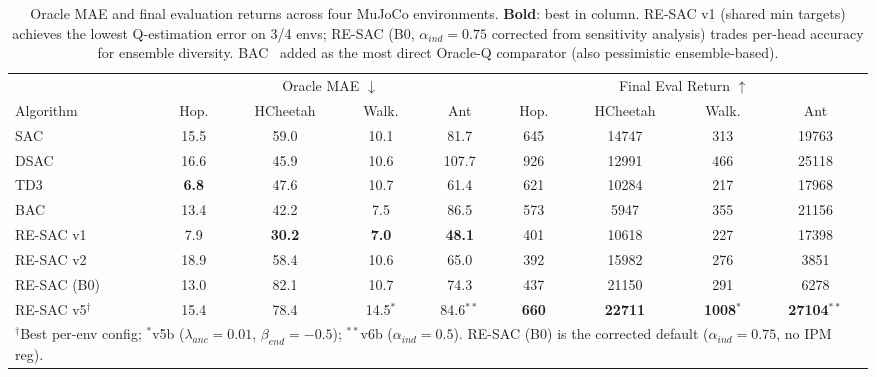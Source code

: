 \documentclass[10pt]{article}
\begin{document}
\begin{table}[!htbp]
\centering
\caption{Oracle MAE and final evaluation returns across four MuJoCo environments. \textbf{Bold}: best in column. RE-SAC v1 (shared min targets) achieves the lowest Q-estimation error on 3/4 envs; RE-SAC (B0, $\alpha_{ind}{=}0.75$ corrected from sensitivity analysis) trades per-head accuracy for ensemble diversity. BAC~\cite{Ji2024SeizingSerendipity} added as the most direct Oracle-Q comparator (also pessimistic ensemble-based).}
\label{tab:oracle_mae}
\begin{tabular}{l|cccc|cccc}
\toprule
 & \multicolumn{4}{c|}{Oracle MAE $\downarrow$} & \multicolumn{4}{c}{Final Eval Return $\uparrow$} \\
Algorithm & Hop. & HCheetah & Walk. & Ant & Hop. & HCheetah & Walk. & Ant \\
\midrule
SAC          & 15.5          & 59.0          & 10.1          & 81.7   & 645   & 14747  & 313   & 19763 \\
DSAC         & 16.6          & 45.9          & 10.6          & 107.7  & 926   & 12991  & 466   & 25118 \\
TD3          & \textbf{6.8}  & 47.6          & 10.7          & 61.4   & 621   & 10284  & 217   & 17968 \\
BAC          & 13.4          & 42.2          & 7.5           & 86.5   & 573   & 5947   & 355   & 21156 \\
\midrule
RE-SAC v1    & 7.9           & \textbf{30.2} & \textbf{7.0}  & \textbf{48.1} & 401   & 10618  & 227   & 17398 \\
RE-SAC v2    & 18.9          & 58.4          & 10.6          & 65.0   & 392   & 15982  & 276   & 3851 \\
RE-SAC (B0)  & 13.0          & 82.1          & 10.7          & 74.3   & 437   & 21150  & 291   & 6278 \\
RE-SAC v5$^\dagger$ & 15.4   & 78.4          & 14.5$^*$      & 84.6$^{**}$ & \textbf{660}   & \textbf{22711}  & \textbf{1008}$^*$  & \textbf{27104}$^{**}$ \\
\bottomrule
\multicolumn{9}{l}{\footnotesize $^\dagger$Best per-env config; $^*$v5b ($\lambda_{anc}{=}0.01$, $\beta_{end}{=}{-0.5}$); $^{**}$v6b ($\alpha_{ind}{=}0.5$). RE-SAC (B0) is the corrected default ($\alpha_{ind}{=}0.75$, no IPM reg).}
\end{tabular}
\end{table}
\end{document}
